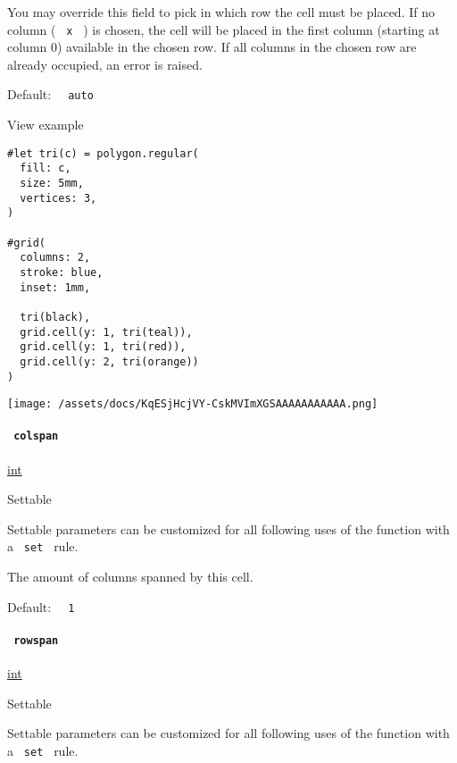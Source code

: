 You may override this field to pick in which row the cell must be
placed. If no column ( \texttt{\ x\ } ) is chosen, the cell will be
placed in the first column (starting at column 0) available in the
chosen row. If all columns in the chosen row are already occupied, an
error is raised.

Default: \texttt{\ }{\texttt{\ auto\ }}\texttt{\ }


View example

\begin{verbatim}
#let tri(c) = polygon.regular(
  fill: c,
  size: 5mm,
  vertices: 3,
)

#grid(
  columns: 2,
  stroke: blue,
  inset: 1mm,

  tri(black),
  grid.cell(y: 1, tri(teal)),
  grid.cell(y: 1, tri(red)),
  grid.cell(y: 2, tri(orange))
)
\end{verbatim}

\texttt{[image: /assets/docs/KqESjHcjVY-CskMVImXGSAAAAAAAAAAA.png]}

\paragraph{\texorpdfstring{\texttt{\ colspan\ }}{ colspan }}\label{definitions-cell-colspan}

\href{/docs/reference/foundations/int/}{int}

{{ Settable }}

\label{definitions-cell-colspan-settable-tooltip}
Settable parameters can be customized for all following uses of the
function with a \texttt{\ set\ } rule.

The amount of columns spanned by this cell.

Default: \texttt{\ }{\texttt{\ 1\ }}\texttt{\ }

\paragraph{\texorpdfstring{\texttt{\ rowspan\ }}{ rowspan }}\label{definitions-cell-rowspan}

\href{/docs/reference/foundations/int/}{int}

{{ Settable }}

\label{definitions-cell-rowspan-settable-tooltip}
Settable parameters can be customized for all following uses of the
function with a \texttt{\ set\ } rule.

